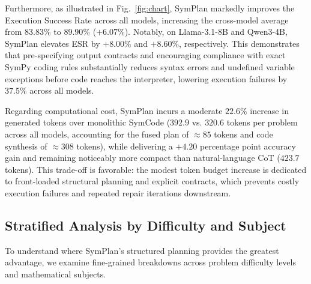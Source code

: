 \documentclass[runningheads]{llncs}
\begin{document}
Furthermore, as illustrated in Fig.~\ref{fig:chart}, SymPlan markedly improves the Execution Success Rate across all models, increasing the cross-model average from $83.83\%$ to $89.90\%$ ($+6.07\%$). Notably, on Llama-3.1-8B and Qwen3-4B, SymPlan elevates ESR by $+8.00\%$ and $+8.60\%$, respectively. This demonstrates that pre-specifying output contracts and encouraging compliance with exact SymPy coding rules substantially reduces syntax errors and undefined variable exceptions before code reaches the interpreter, lowering execution failures by $37.5\%$ across all models.

Regarding computational cost, SymPlan incurs a moderate $22.6\%$ increase in generated tokens over monolithic SymCode ($392.9$ vs. $320.6$ tokens per problem across all models, accounting for the fused plan of $\approx 85$ tokens and code synthesis of $\approx 308$ tokens), while delivering a $+4.20$ percentage point accuracy gain and remaining noticeably more compact than natural-language CoT ($423.7$ tokens). This trade-off is favorable: the modest token budget increase is dedicated to front-loaded structural planning and explicit contracts, which prevents costly execution failures and repeated repair iterations downstream.

\subsection{Stratified Analysis by Difficulty and Subject}

To understand where SymPlan's structured planning provides the greatest advantage, we examine fine-grained breakdowns across problem difficulty levels and mathematical subjects.
\end{document}
